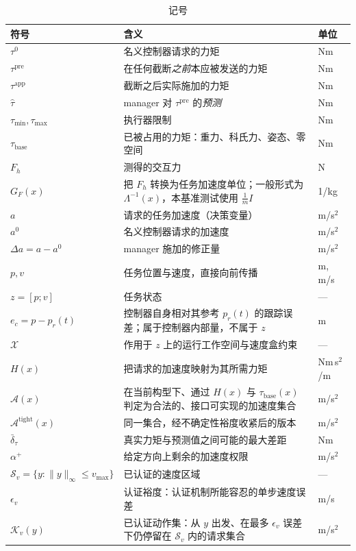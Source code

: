\documentclass[journal]{IEEEtran}
\begin{document}
\begin{table}[t]
\caption{记号}
\label{tab:notation}
\centering
\footnotesize
\setlength{\tabcolsep}{3pt}
\begin{tabular}{@{}p{1.7cm}p{5.3cm}p{0.7cm}@{}}
\toprule
符号 & 含义 & 单位 \\
\midrule
$\tau^0$ & 名义控制器请求的力矩 & Nm \\
$\tau^{\mathrm{pre}}$ & 在任何截断\emph{之前}本应被发送的力矩 & Nm \\
$\tau^{\mathrm{app}}$ & 截断之后实际施加的力矩 & Nm \\
$\hat\tau$ & manager 对 $\tau^{\mathrm{pre}}$ 的\emph{预测} & Nm \\
$\tau_{\min},\tau_{\max}$ & 执行器限制 & Nm \\
$\tau_{\mathrm{base}}$ & 已被占用的力矩：重力、科氏力、姿态、零空间 & Nm \\
$F_h$ & 测得的交互力 & N \\
$G_F(x)$ & 把 $F_h$ 转换为任务加速度单位；一般形式为 $\Lambda^{-1}(x)$，本基准测试使用 $\tfrac1m I$ & 1/kg \\
$a$ & 请求的任务加速度（决策变量） & m/s$^2$ \\
$a^{0}$ & 名义控制器请求的加速度 & m/s$^2$ \\
$\Delta a=a-a^{0}$ & manager 施加的修正量 & m/s$^2$ \\
$p,v$ & 任务位置与速度，直接向前传播 & m, m/s \\
$z=[p;v]$ & 任务状态 & --- \\
$e_c=p-p_r(t)$ & 控制器自身相对其参考 $p_r(t)$ 的跟踪误差；属于控制器内部量，不属于 $z$ & m \\
$\mathcal X$ & 作用于 $z$ 上的运行工作空间与速度盒约束 & --- \\
$H(x)$ & 把请求的加速度映射为其所需力矩 & Nm\,s$^2$/m \\
$\mathcal A(x)$ & 在当前构型下、通过 $H(x)$ 与 $\tau_{\mathrm{base}}(x)$ 判定为合法的、接口可实现的加速度集合 & m/s$^2$ \\
$\mathcal A^{\mathrm{tight}}(x)$ & 同一集合，经不确定性裕度收紧后的版本 & m/s$^2$ \\
$\bar\delta_\tau$ & 真实力矩与预测值之间可能的最大差距 & Nm \\
$\alpha^{+}$ & 给定方向上剩余的加速度权限 & m/s$^2$ \\
$\mathcal S_v=\{y:\|y\|_\infty\le v_{\max}\}$ & 已认证的速度区域 & --- \\
$\epsilon_v$ & 认证裕度：认证机制所能容忍的单步速度误差 & m/s \\
$\mathcal K_v(y)$ & 已认证动作集：从 $y$ 出发、在最多 $\epsilon_v$ 误差下仍停留在 $\mathcal S_v$ 内的请求集合 & m/s$^2$ \\
\bottomrule
\end{tabular}
\end{table}
\end{document}
